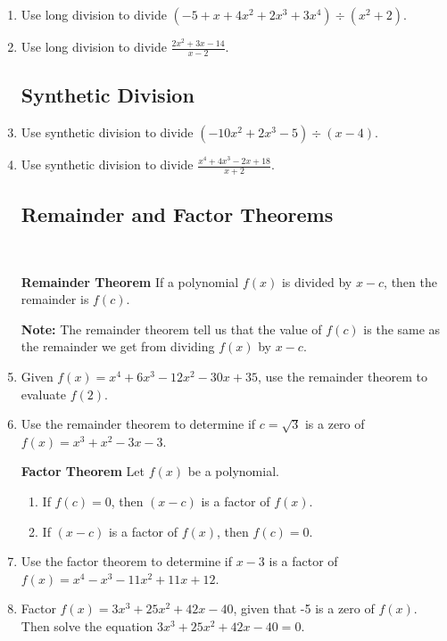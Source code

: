 \begin{enumerate}

\item Use long division to divide $(-5+x+4x^2+2x^3+3x^4) \div (x^2+2)$.
\vfill
\vfill

\item Use long division to divide $\displaystyle \frac{2x^2+3x-14}{x-2}$.
\vfill

\newpage




\subsection{Synthetic Division}
\item Use synthetic division to divide $(-10x^2+2x^3-5) \div (x-4)$.
\vfill


\item Use synthetic division to divide $\displaystyle \frac{x^4+4x^3-2x+18}{x+2}$.
\vfill

\newpage
\subsection{Remainder and Factor Theorems} ~

\begin{boxthm}
{\bf Remainder Theorem}
If a polynomial $f(x)$ is divided by $x-c$, then the remainder is $f(c)$.
\end{boxthm}

\textbf{Note:  }The remainder theorem tell us that the value of $f(c)$ is the same as the remainder we get from dividing $f(x)$ by $x-c$.

\item Given $f(x)=x^4+6x^3-12x^2-30x+35$, use the remainder theorem to evaluate $f(2)$.
\vfill

\item Use the remainder theorem to determine if $c=\sqrt{3}$ is a zero of $f(x)=x^3+x^2-3x-3$.
\vfill

\newpage

\begin{boxthm}
{\bf Factor Theorem}
Let $f(x)$ be a polynomial.
\begin{enumerate}
\item If $f(c)=0$, then $(x-c)$ is a factor of $f(x)$.
\item If $(x-c)$ is a factor of $f(x)$, then $f(c)=0$.
\end{enumerate}
\end{boxthm}

\item Use the factor theorem to determine if $x-3$ is a factor of $f(x)=x^4-x^3-11x^2+11x+12$.
\vfill

\item Factor $f(x)=3x^3+25x^2+42x-40$, given that -5 is a zero of $f(x)$.  Then solve the equation $3x^3+25x^2+42x-40=0$.
\vfill
\vfill



\end{enumerate}


